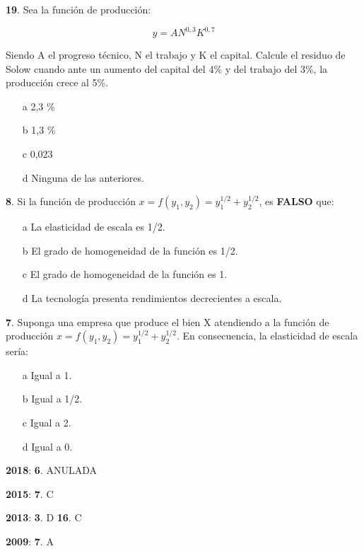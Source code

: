 \documentclass{nuevotema}
\begin{document}
\textbf{19}. Sea la función de producción:

\begin{equation}
	y=AN^{0,3}K^{0,7}
\end{equation}

Siendo A el progreso técnico, N el trabajo y K el capital. Calcule el residuo de Solow cuando ante un aumento del capital del 4\% y del trabajo del 3\%, la producción crece al 5\%.

\begin{enumerate}
	\item[a] 2,3 \%
	\item[b] 1,3 \%
	\item[c] 0,023
	\item[d] Ninguna de las anteriores.
\end{enumerate}


\textbf{8}. Si la función de producción $x=f(y_1, y_2) = y_1^{1/2} + y_2^{1/2}$, es \textbf{FALSO} que:

\begin{enumerate}
	\item[a] La elasticidad de escala es 1/2.
	\item[b] El grado de homogeneidad de la función es 1/2.
	\item[c] El grado de homogeneidad de la función es 1.
	\item[d] La tecnología presenta rendimientos decrecientes a escala.
\end{enumerate}


\textbf{7}. Suponga una empresa que produce el bien X atendiendo a la función de producción $x = f(y_1, y_2)=y_1^{1/2} + y_2^{1/2}$. En consecuencia, la elasticidad de escala sería:

\begin{enumerate}
	\item[a] Igual a 1.
	\item[b] Igual a 1/2.
	\item[c] Igual a 2.
	\item[d] Igual a 0.
\end{enumerate}

\notas

\textbf{2018}: \textbf{6}. ANULADA

\textbf{2015}: \textbf{7}. C

\textbf{2013}: \textbf{3}. D \textbf{16}. C

\textbf{2009}: \textbf{7}. A
\end{document}
